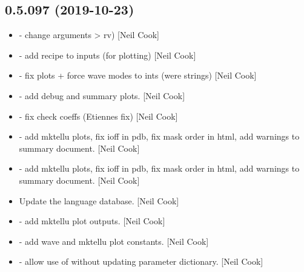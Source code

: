\documentclass[a4paper,10pt,english]{report}
\begin{document}
\subsection{0.5.097 (2019-10-23)}
\label{\detokenize{misc/changelog:id46}}\begin{itemize}
\item {} 
 - change arguments  \textendash{}\textgreater{} rv) {[}Neil
Cook{]}

\item {} 
 - add recipe to inputs (for plotting)
{[}Neil Cook{]}

\item {} 
 - fix plots + force wave modes to ints (were
strings) {[}Neil Cook{]}

\item {} 
 - add debug and summary plots. {[}Neil
Cook{]}

\item {} 
 - fix check coeffs (Etiennes fix)
{[}Neil Cook{]}

\item {} 
 - add mktellu plots, fix ioff in pdb, fix mask order in
html, add warnings to summary document. {[}Neil Cook{]}

\item {} 
 - add mktellu plots, fix ioff in pdb, fix mask order in
html, add warnings to summary document. {[}Neil Cook{]}

\item {} 
Update the language database. {[}Neil Cook{]}

\item {} 
 - add mktellu plot
outputs. {[}Neil Cook{]}

\item {} 
 - add wave and mktellu plot
constants. {[}Neil Cook{]}

\item {} 
 - allow use of  without updating parameter
dictionary. {[}Neil Cook{]}

\end{itemize}
\end{document}

